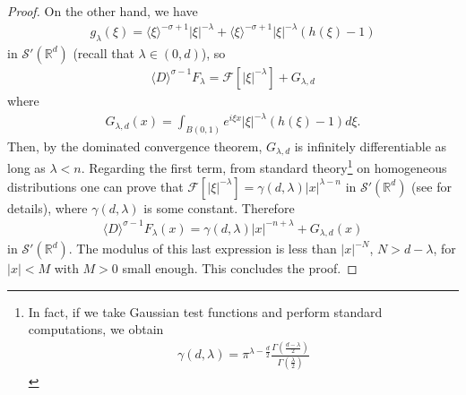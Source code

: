 \documentclass[a4paper, reqno, 11pt]{amsart}
\theoremstyle{definition}
\begin{document}
\begin{proof}
On the other hand, we have
\begin{align*}
g_{\lambda}(\xi) = \langle \xi \rangle^{-\sigma+1}|\xi|^{-\lambda} +  \langle \xi \rangle^{-\sigma+1} |\xi|^{-\lambda} ( h(\xi) - 1 )
\end{align*}
in $\mathcal{S}'(\mathbb{R}^d)$ (recall that $\lambda \in (0,d)$), so
\begin{align}\label{eq:Flambda-proof1}
\langle D \rangle^{\sigma-1} F_{\lambda} = \mathcal{F}[|\xi|^{-\lambda}] + G_{\lambda,d}
\end{align}
where
\begin{align*}
G_{\lambda,d}(x) = \int_{B(0,1)} e^{i\xi x} |\xi|^{-\lambda}(h(\xi) - 1)d\xi.
\end{align*}
Then, by the dominated convergence theorem, $G_{\lambda,d}$ is infinitely differentiable as long as $\lambda < n$. Regarding the first term, from standard theory\footnote{In fact, if we take Gaussian test functions and perform standard computations, we obtain
\begin{align*}
\gamma(d,\lambda) = \pi^{\lambda-\frac{d}{2}}\frac{\Gamma(\frac{d-\lambda}{2})}{\Gamma(\frac{\lambda}{2})}
\end{align*}} on homogeneous distributions one can prove that $\mathcal{F}[|\xi|^{-\lambda}] = \gamma(d,\lambda) |x|^{\lambda-n}$ in $\mathcal{S}'(\mathbb{R}^d)$ (see \cite{wolff} for  details), where $\gamma(d,\lambda)$ is some constant.
Therefore
\begin{align*}
\langle D \rangle^{\sigma-1} F_{\lambda}(x) = \gamma(d,\lambda) |x|^{-n+\lambda} + G_{\lambda,d}(x)
\end{align*}
in $\mathcal{S}'(\mathbb{R}^d)$. The modulus of this last expression is less than $|x|^{-N}$, $N > d - \lambda$, for $|x| < M$ with $M > 0$ small enough. This concludes the proof.
\end{proof}
\end{document}
